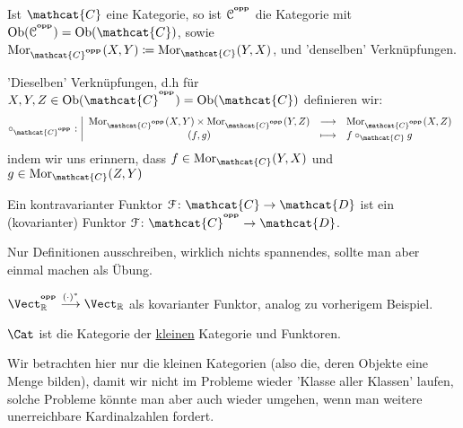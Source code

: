 \begin{definition}[Dualkategorie]\label{def:dualkategorie}
    Ist $\mathcat{C}$ eine Kategorie, so ist $\mathcal{C}^{^{\operatorname{\textbf{opp}}}}$ die Kategorie mit $\Ob(\mathcal{C}^{\op}) = \Ob(\mathcat{C})$, sowie $\Mor_{\mathcat{C}^{\op}}(X,Y) \coloneqq \Mor_{\mathcat{C}}(Y,X)$, und 'denselben' Verknüpfungen.
\end{definition}

\begin{remark*}
    'Dieselben' Verknüpfungen, d.h für $X,Y,Z \in  \Ob(\mathcat{C}^{\op}) = \Ob(\mathcat{C})$ definieren wir:
        \begin{equation*}
        \circ _{\mathcat{C}^{\op}}: \left| \begin{array}{c c l} 
            \Mor_{\mathcat{C}^{\op}}(X,Y) \times  \Mor_{\mathcat{C}^{\op}}(Y,Z) & \longrightarrow & \Mor_{\mathcat{C}^{\op}}(X,Z) \\
            (f,g) & \longmapsto &  f \circ _{\mathcat{C}} g
        \end{array} \right.
    \end{equation*}
    indem wir uns erinnern, dass $f \in \Mor_{\mathcat{C}}(Y,X)$ und $g\in \Mor_{\mathcat{C}}(Z,Y)$
\end{remark*}

\begin{lemma}\label{lm:kovariante-funktoren-sind-funktoren-von-der-dualen-kategorie}
    Ein kontravarianter Funktor $\mathcal{F}\colon \mathcat{C} \to  \mathcat{D}$ ist ein (kovarianter) Funktor $\mathcal{F}\colon  \mathcat{C}^{\op} \to  \mathcat{D}$.
\end{lemma}
\begin{proof*}
    Nur Definitionen ausschreiben, wirklich nichts spannendes, sollte man aber einmal machen als Übung.
\end{proof*}

\begin{example}
$\Vect_{\R}^{\op} \stackrel{(\cdot )^*}{\longrightarrow} \Vect_{\R}$ als kovarianter Funktor, analog zu vorherigem Beispiel.
\end{example}

\begin{example}
    $\Cat$ ist die Kategorie der  \underline{kleinen} Kategorie und Funktoren. 
\end{example}

\begin{oral}
    Wir betrachten hier nur die kleinen Kategorien (also die, deren Objekte eine Menge bilden), damit wir nicht im Probleme wieder 'Klasse aller Klassen' laufen, solche Probleme könnte man aber auch wieder umgehen, wenn man weitere unerreichbare Kardinalzahlen fordert.
\end{oral}

